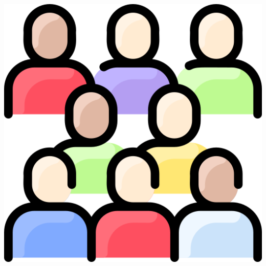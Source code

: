 \documentclass{beamer}
\begin{document}
\begin{CJK*}{UTF8}{bsmi}
\begin{frame}
\begin{columns}
\begin{column}{0.30\textwidth}
                \includegraphics[height=0.3\textheight]{people.png}
            \end{column}
        \end{columns}
    \end{frame}


\end{CJK*}
\end{document}
